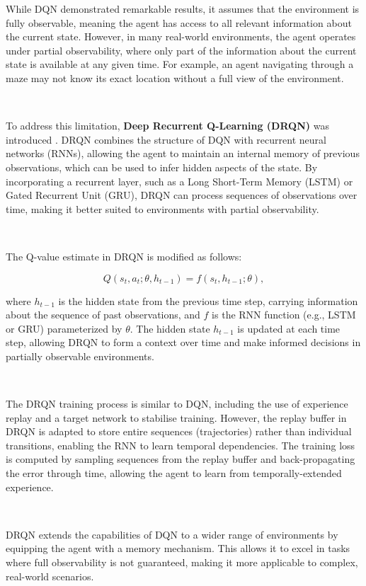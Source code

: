 \documentclass{article}
\begin{document}
While DQN demonstrated remarkable results, it assumes that the environment is fully observable, meaning the agent has access to all relevant information about the current state. However, in many real-world environments, the agent operates under partial observability, where only part of the information about the current state is available at any given time. For example, an agent navigating through a maze may not know its exact location without a full view of the environment.

\

To address this limitation, \textbf{Deep Recurrent Q-Learning (DRQN)} was introduced \citep{hausknecht2015deep}. DRQN combines the structure of DQN with recurrent neural networks (RNNs), allowing the agent to maintain an internal memory of previous observations, which can be used to infer hidden aspects of the state. By incorporating a recurrent layer, such as a Long Short-Term Memory (LSTM) or Gated Recurrent Unit (GRU), DRQN can process sequences of observations over time, making it better suited to environments with partial observability.

\

The Q-value estimate in DRQN is modified as follows:

\begin{equation}
Q(s_t, a_t; \theta, h_{t-1}) = f(s_t, h_{t-1}; \theta),
\end{equation}

where $h_{t-1}$ is the hidden state from the previous time step, carrying information about the sequence of past observations, and $f$ is the RNN function (e.g., LSTM or GRU) parameterized by $\theta$. The hidden state $h_{t-1}$ is updated at each time step, allowing DRQN to form a context over time and make informed decisions in partially observable environments.

\

The DRQN training process is similar to DQN, including the use of experience replay and a target network to stabilise training. However, the replay buffer in DRQN is adapted to store entire sequences (trajectories) rather than individual transitions, enabling the RNN to learn temporal dependencies. The training loss is computed by sampling sequences from the replay buffer and back-propagating the error through time, allowing the agent to learn from temporally-extended experience.

\

DRQN extends the capabilities of DQN to a wider range of environments by equipping the agent with a memory mechanism. This allows it to excel in tasks where full observability is not guaranteed, making it more applicable to complex, real-world scenarios.
\end{document}
